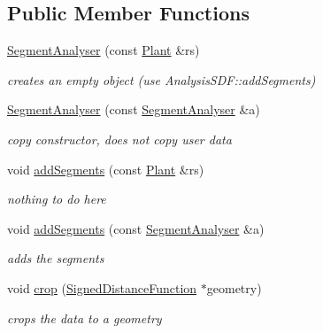 \subsection*{Public Member Functions}
\begin{DoxyCompactItemize}
\item 
\hyperlink{classCPlantBox_1_1SegmentAnalyser_aa90925db52f92b3875e19897a1319059}{Segment\+Analyser} (const \hyperlink{classCPlantBox_1_1Plant}{Plant} \&rs)
\begin{DoxyCompactList}\small\item\em creates an empty object (use Analysis\+S\+D\+F\+::add\+Segments) \end{DoxyCompactList}\item 
\mbox{\label{classCPlantBox_1_1SegmentAnalyser_a3c27c772f78633f3c40aa61fcb05e0e4}} 
\hyperlink{classCPlantBox_1_1SegmentAnalyser_a3c27c772f78633f3c40aa61fcb05e0e4}{Segment\+Analyser} (const \hyperlink{classCPlantBox_1_1SegmentAnalyser}{Segment\+Analyser} \&a)
\begin{DoxyCompactList}\small\item\em copy constructor, does not copy user data \end{DoxyCompactList}\item 
void \hyperlink{classCPlantBox_1_1SegmentAnalyser_a3ff7165b8d0201bddee92b3338b95839}{add\+Segments} (const \hyperlink{classCPlantBox_1_1Plant}{Plant} \&rs)
\begin{DoxyCompactList}\small\item\em nothing to do here \end{DoxyCompactList}\item 
void \hyperlink{classCPlantBox_1_1SegmentAnalyser_ac374e94bd9eddf2e7c6dd840e13d125d}{add\+Segments} (const \hyperlink{classCPlantBox_1_1SegmentAnalyser}{Segment\+Analyser} \&a)
\begin{DoxyCompactList}\small\item\em adds the segments \end{DoxyCompactList}\item 
void \hyperlink{classCPlantBox_1_1SegmentAnalyser_ad36ee62a998e34484b96b2c12ec92fca}{crop} (\hyperlink{classCPlantBox_1_1SignedDistanceFunction}{Signed\+Distance\+Function} $\ast$geometry)
\begin{DoxyCompactList}\small\item\em crops the data to a geometry \end{DoxyCompactList}\item 

\end{DoxyCompactItemize}

